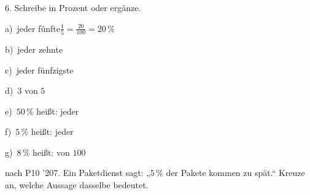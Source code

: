 \documentclass[11pt]{article}
\newcommand{\grau}[1]{{\color{mbgrau}#1}}
\begin{document}
\begin{pfaufg}{}{6.}{}
Schreibe in Prozent oder ergänze.\par\medskip
\grau{a)\ jeder fünfte\quad $\frac{1}{5} = \frac{20}{100} = 20\,\%$}\par\medskip
\noindent\begin{minipage}[t]{0.48\linewidth}
b)\ jeder zehnte
\end{minipage}\hfill
\begin{minipage}[t]{0.48\linewidth}
c)\ jeder fünfzigste
\end{minipage}
\noindent\begin{minipage}[t]{0.48\linewidth}
d)\ $3$ von $5$
\end{minipage}\hfill
\begin{minipage}[t]{0.48\linewidth}
e)\ $50\,\%$ heißt: jeder \linie{10mm}
\end{minipage}
\noindent\begin{minipage}[t]{0.48\linewidth}
f)\ $5\,\%$ heißt: jeder \linie{10mm}
\end{minipage}\hfill
\begin{minipage}[t]{0.48\linewidth}
g)\ $8\,\%$ heißt: \linie{10mm} von $100$
\end{minipage}
\end{pfaufg}

\begin{pfaufg}{nach P10 ’20}{7.}{}
Ein Paketdienst sagt: „$5\,\%$ der Pakete kommen zu spät.“ Kreuze an, welche Aussage dasselbe bedeutet.\par\medskip\noindent{}\par\smallskip\noindent{}\par\smallskip\noindent{}\par
{}
\end{pfaufg}
\end{document}
